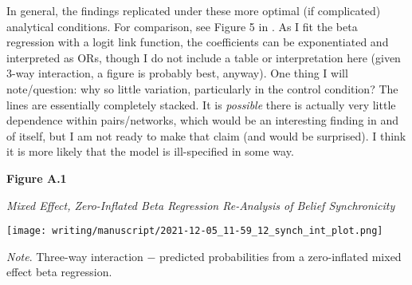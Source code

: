 \documentclass[12pt]{article}  %
\begin{document}
In general, the findings replicated under these more optimal (if complicated) analytical conditions. For comparison, see Figure 5 in \textcite{vlasceanu_synchronization_2020}. As I fit the beta regression with a logit link function, the coefficients can be exponentiated and interpreted as ORs, though I do not include a table or interpretation here (given 3-way interaction, a figure is probably best, anyway). One thing I will note/question: why so little variation, particularly in the control condition? The lines are essentially completely stacked. It is \textit{possible} there is actually very little dependence within pairs/networks, which would be an interesting finding in and of itself, but I am not ready to make that claim (and would be surprised). I think it is more likely that the model is ill-specified in some way.

\textbf{Figure A.1}

\textit{Mixed Effect, Zero-Inflated Beta Regression Re-Analysis of Belief Synchronicity}

\vspace{0.5cm}

\hspace{-1.5cm}\texttt{[image: writing/manuscript/2021-12-05\_11-59\_12\_synch\_int\_plot.png]}

\singlespacing
\noindent\textit{Note}. Three-way interaction $-$ predicted probabilities from a zero-inflated mixed effect beta regression.
\end{document}
